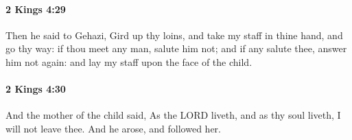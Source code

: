 		\paragraph{2 Kings 4:29} %
			\label{2KINGS-4-29}

			Then he said to Gehazi, Gird up thy loins, and take my staff in thine hand, and go thy way: if thou meet any man, salute him not; and if any salute thee, answer him not again: and lay my staff upon the face of the child.


		\paragraph{2 Kings 4:30} %
			\label{2KINGS-4-30}

			And the mother of the child said, As the LORD liveth, and as thy soul liveth, I will not leave thee. And he arose, and followed her.



